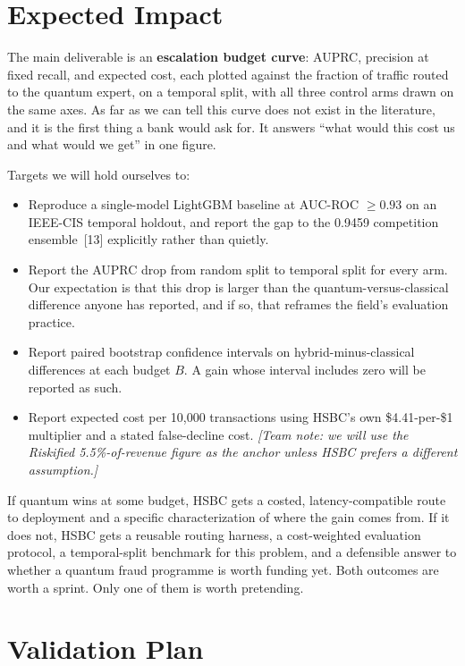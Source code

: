 \documentclass[10pt,a4paper]{article}
\begin{document}
\section{Expected Impact}

The main deliverable is an \textbf{escalation budget curve}: AUPRC, precision at fixed recall, and expected cost, each plotted against the fraction of traffic routed to the quantum expert, on a temporal split, with all three control arms drawn on the same axes. As far as we can tell this curve does not exist in the literature, and it is the first thing a bank would ask for. It answers ``what would this cost us and what would we get'' in one figure.

Targets we will hold ourselves to:

\begin{itemize}
\item Reproduce a single-model LightGBM baseline at AUC-ROC $\geq 0.93$ on an IEEE-CIS temporal holdout, and report the gap to the 0.9459 competition ensemble~[13] explicitly rather than quietly.
\item Report the AUPRC drop from random split to temporal split for every arm. Our expectation is that this drop is larger than the quantum-versus-classical difference anyone has reported, and if so, that reframes the field's evaluation practice.
\item Report paired bootstrap confidence intervals on hybrid-minus-classical differences at each budget $B$. A gain whose interval includes zero will be reported as such.
\item Report expected cost per 10{,}000 transactions using HSBC's own \$4.41-per-\$1 multiplier and a stated false-decline cost. \emph{[Team note: we will use the Riskified 5.5\%-of-revenue figure as the anchor unless HSBC prefers a different assumption.]}
\end{itemize}

If quantum wins at some budget, HSBC gets a costed, latency-compatible route to deployment and a specific characterization of where the gain comes from. If it does not, HSBC gets a reusable routing harness, a cost-weighted evaluation protocol, a temporal-split benchmark for this problem, and a defensible answer to whether a quantum fraud programme is worth funding yet. Both outcomes are worth a sprint. Only one of them is worth pretending.

\section{Validation Plan}
\end{document}
